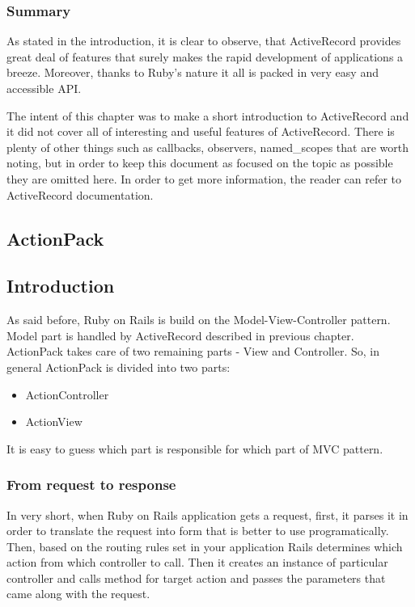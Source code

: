       \subsubsection{Summary}
      As stated in the introduction, it is clear to observe, that ActiveRecord provides great deal
      of features that surely makes the rapid development of applications a breeze. Moreover, thanks
      to Ruby's nature it all is packed in very easy and accessible API.

      The intent of this chapter was to make a short introduction to ActiveRecord and it did not cover
      all of interesting and useful features of ActiveRecord. There is plenty of other things such as
      callbacks, observers, named\_scopes that are worth noting, but in order to keep
      this document as focused on the topic as possible they are omitted here. In order to get more
      information, the reader can refer to ActiveRecord documentation.
      
    \subsection{ActionPack}
      \subsection{Introduction}
      As said before, Ruby on Rails is build on the Model-View-Controller pattern. Model part is
      handled by ActiveRecord described in previous chapter. ActionPack takes care of two remaining
      parts - View and Controller. So, in general ActionPack is divided into two parts:
      \begin{itemize}
        \item{ActionController}
        \item{ActionView}
      \end{itemize}
      It is easy to guess which part is responsible for which part of MVC pattern.
      
      \subsubsection{From request to response}
      In very short, when Ruby on Rails application gets a request, first, it parses it in order 
      to translate the request into form that is better to use programatically. Then, based on the
      routing rules set in your application Rails determines which action from which controller
      to call. Then it creates an instance of particular controller and calls method for 
      target action and passes the parameters that came along with the request.
      
